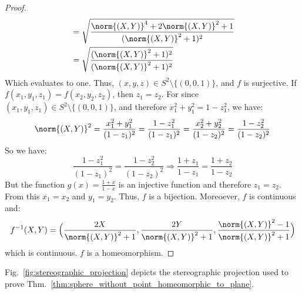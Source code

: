 \begin{proof}
\begin{subequations}
\begin{align}
                        &=\sqrt{\frac{\norm{(X,Y)}^{4}+2\norm{(X,Y)}^{2}+1}
                                     {(\norm{(X,Y)}^{2}+1)^{2}}}\\
                        &=\sqrt{%
                            \frac{(\norm{(X,Y)}^{2}+1)^{2}}
                                 {(\norm{(X,Y)}^{2}+1)^{2}}%
                        }
                    \end{align}
                \end{subequations}
                Which evaluates to one. Thus,
                $(x,y,z)\in S^{2}\setminus\{(0,0,1)\}$, and $f$ is surjective.
                If $f(x_{1},y_{1},z_{1})=f(x_{2},y_{2},z_{2})$, then
                $z_{1}=z_{2}$. For since
                $(x_{1},y_{1},z_{1})\in S^{2}\setminus\{(0,0,1)\}$,
                and therefore $x_{1}^{2}+y_{1}^{2}=1-z_{1}^{2}$, we have:
                \begin{equation}
                    \norm{(X,Y)}^{2}
                    =\frac{x_{1}^2+y_{1}^2}{(1-z_{1})^{2}}
                    =\frac{1-z_{1}^{2}}{(1-z_{1})^{2}}
                    =\frac{x_{2}^{2}+y_{2}^{2}}{(1-z_{2})^{2}}
                    =\frac{1-z_{2}^{2}}{(1-z_{2})^{2}}
                \end{equation}
                So we have:
                \begin{equation}
                    \frac{1-z_{1}^{2}}{(1-z_{1})^{2}}
                    =\frac{1-z_{2}^{2}}{(1-z_{2})^{2}}
                    \Rightarrow
                    \frac{1+z_{1}}{1-z_{1}}
                    =\frac{1+z_{2}}{1-z_{2}}
                \end{equation}
                But the function $g(x)=\frac{1+x}{1-x}$ is an injective function
                and therefore $z_{1}=z_{2}$. From this $x_{1}=x_{2}$ and
                $y_{1}=y_{2}$. Thus, $f$ is a bijection. Moreoever,
                $f$ is continuous and:
                \begin{equation}
                    f^{-1}(X,Y)
                    =\Big(\frac{2X}{\norm{(X,Y)}^{2}+1},
                        \frac{2Y}{\norm{(X,Y)}^{2}+1},
                        \frac{\norm{(X,Y)}^{2}-1}{\norm{(X,Y)}^{2}+1}\Big)
                \end{equation}
                which is continuous. $f$ is a homeomorphism.
            \end{proof}
            Fig.~\ref{fig:stereographic_projection} depicts the stereographic
            projection used to prove
            Thm.~\ref{thm:sphere_without_point_homeomorphic_to_plane}.
